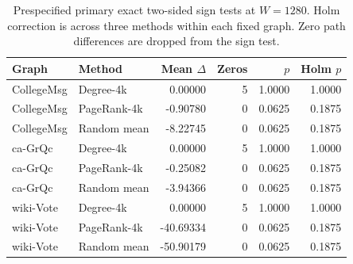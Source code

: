 \begin{table}[htbp]
\caption{Prespecified primary exact two-sided sign tests at $W=1280$. Holm correction is across three methods within each fixed graph. Zero path differences are dropped from the sign test.}\label{tab:tests}
\begin{tabular}{llrrrr}
\toprule
Graph & Method & Mean $\Delta$ & Zeros & $p$ & Holm $p$ \\
\midrule
CollegeMsg & Degree-4k & 0.00000 & 5 & 1.0000 & 1.0000 \\
CollegeMsg & PageRank-4k & -0.90780 & 0 & 0.0625 & 0.1875 \\
CollegeMsg & Random mean & -8.22745 & 0 & 0.0625 & 0.1875 \\
ca-GrQc & Degree-4k & 0.00000 & 5 & 1.0000 & 1.0000 \\
ca-GrQc & PageRank-4k & -0.25082 & 0 & 0.0625 & 0.1875 \\
ca-GrQc & Random mean & -3.94366 & 0 & 0.0625 & 0.1875 \\
wiki-Vote & Degree-4k & 0.00000 & 5 & 1.0000 & 1.0000 \\
wiki-Vote & PageRank-4k & -40.69334 & 0 & 0.0625 & 0.1875 \\
wiki-Vote & Random mean & -50.90179 & 0 & 0.0625 & 0.1875 \\
\bottomrule
\end{tabular}
\end{table}

